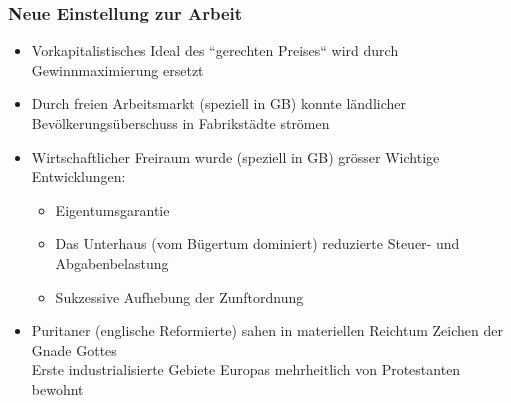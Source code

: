 \documentclass{report}
\begin{document}
\subsubsection{Neue Einstellung zur Arbeit}
\begin{itemize}
	\item Vorkapitalistisches Ideal des ``gerechten Preises`` wird durch Gewinnmaximierung ersetzt
	\item Durch freien Arbeitsmarkt (speziell in GB) konnte ländlicher Bevölkerungsüberschuss in Fabrikstädte strömen
	\item Wirtschaftlicher Freiraum wurde (speziell in GB) grösser 
		\arrow Wichtige Entwicklungen:
		\begin{itemize}
			\item Eigentumsgarantie
			\item Das Unterhaus (vom Bügertum dominiert) reduzierte Steuer- und Abgabenbelastung 
			\item Sukzessive Aufhebung der Zunftordnung
		\end{itemize}
	\item Puritaner (englische Reformierte) sahen in materiellen Reichtum Zeichen der Gnade Gottes\\
	Erste industrialisierte Gebiete Europas mehrheitlich von Protestanten bewohnt

\end{itemize}
\end{document}

